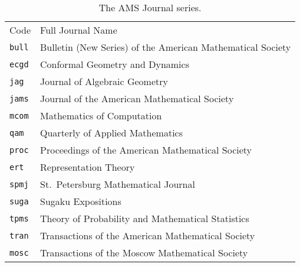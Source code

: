 
\begin{table}[h!]
\small
\renewcommand{\arraystretch}{.98}
\caption{The AMS Journal series.}\label{tbl:series}
\begin{tabular}{@{}ll}
Code & \hspace*{.75in}Full Journal Name\\[.5pc]
\verb+bull+&     Bulletin (New Series) of the American Mathematical Society\\
\verb+ecgd+&     Conformal Geometry and Dynamics\\
\verb+jag+&      Journal of Algebraic Geometry\\
\verb+jams+&     Journal of the American Mathematical Society\\
\verb+mcom+&     Mathematics of Computation\\
\verb+qam+&	Quarterly of Applied Mathematics\\
\verb+proc+&     Proceedings of the American Mathematical Society\\
\verb+ert+&      Representation Theory\\
\verb+spmj+&     St.\ Petersburg Mathematical Journal\\
\verb+suga+&	Sugaku Expositions\\
\verb+tpms+&     Theory of Probability and Mathematical Statistics\\
\verb+tran+&     Transactions of the American Mathematical Society\\
\verb+mosc+&     Transactions of the Moscow Mathematical Society
\end{tabular}
\end{table}
\endinput
